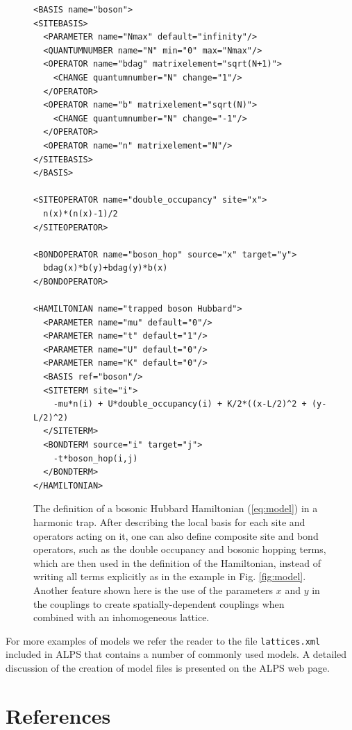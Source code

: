 \documentclass[12pt]{iopart}
\begin{document}
\begin{figure}
\begin{lstlisting}
<BASIS name="boson">
<SITEBASIS>
  <PARAMETER name="Nmax" default="infinity"/>
  <QUANTUMNUMBER name="N" min="0" max="Nmax"/>
  <OPERATOR name="bdag" matrixelement="sqrt(N+1)">
    <CHANGE quantumnumber="N" change="1"/>
  </OPERATOR>
  <OPERATOR name="b" matrixelement="sqrt(N)">
    <CHANGE quantumnumber="N" change="-1"/>
  </OPERATOR>
  <OPERATOR name="n" matrixelement="N"/>
</SITEBASIS>
</BASIS>

<SITEOPERATOR name="double_occupancy" site="x">
  n(x)*(n(x)-1)/2
</SITEOPERATOR>

<BONDOPERATOR name="boson_hop" source="x" target="y">
  bdag(x)*b(y)+bdag(y)*b(x)
</BONDOPERATOR>

<HAMILTONIAN name="trapped boson Hubbard">
  <PARAMETER name="mu" default="0"/>
  <PARAMETER name="t" default="1"/>
  <PARAMETER name="U" default="0"/>
  <PARAMETER name="K" default="0"/>
  <BASIS ref="boson"/>
  <SITETERM site="i">
    -mu*n(i) + U*double_occupancy(i) + K/2*((x-L/2)^2 + (y-L/2)^2)
  </SITETERM> 
  <BONDTERM source="i" target="j">
    -t*boson_hop(i,j)
  </BONDTERM>
</HAMILTONIAN>
\end{lstlisting}
\caption{The definition of a bosonic Hubbard Hamiltonian (\ref{eq:model}) in a harmonic trap.  After
  describing the local basis for each site and operators acting on it, one can also define composite site and bond operators, such as the double occupancy and bosonic hopping terms, which are then used in the definition of the Hamiltonian, instead of writing all terms explicitly as in the example in Fig. \ref{fig:model}. Another feature shown here is the use of the parameters $x$ and $y$ in the couplings to create spatially-dependent couplings when combined with an inhomogeneous lattice.}
\label{fig:hubmodel}
\end{figure}



For more examples of models we refer the reader to the file {\tt lattices.xml} included in ALPS that contains a number of commonly used models. A detailed discussion of the creation of model files is presented on the ALPS web page.

\section*{References}



\end{document}
